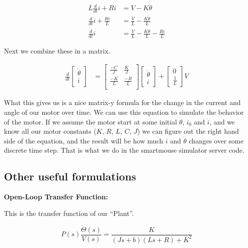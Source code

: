 \documentclass{article}
\begin{document}
\begin{align}
  L\frac{d}{dt}i + Ri &= V - K\dot{\theta} \\
  \frac{d}{dt}i + \frac{Ri}{L} &= \frac{V}{L} - \frac{K\dot{\theta}}{L} \\
  \frac{d}{dt}i &= \frac{V}{L} - \frac{K\dot{\theta}}{L} - \frac{Ri}{L}
\end{align}

Next we combine these in a matrix.

\begin{align}
  \frac{d}{dt}\begin{bmatrix}\dot{\theta}\\i\\\end{bmatrix} &=
    \begin{bmatrix}
      \frac{-C}{J} & \frac{K}{J} \\
      \frac{-K}{L} & \frac{-R}{L} \\
    \end{bmatrix}
    \begin{bmatrix}
      \dot{\theta} \\
      i
    \end{bmatrix}
    +
    \begin{bmatrix}
      0 \\
      \frac{1}{L}
    \end{bmatrix}
    V
\end{align}

What this gives us is a nice matrix-y formula for the change in the current and angle of our motor over time. We can use this equation to simulate the behavior of the motor. If we assume the motor start at some initial $\dot{\theta}$, $i_0$ and $\dot{i}$, and we know all our motor constants ($K$, $R$, $L$, $C$, $J$) we can figure out the right hand side of the equation, and the result will be how much $i$ and $\dot{\theta}$ changes over some discrete time step. That is what we do in the smartmouse simulator server code.

\subsection{Other useful formulations}

\textbf{Open-Loop Transfer Function:}

This is the transfer function of our ``Plant''.

$$ P(s) \frac{\dot{\Theta}(s)}{V(s)} = \frac{K}{(Js+b)(Ls+R)+K^2} $$
\end{document}
